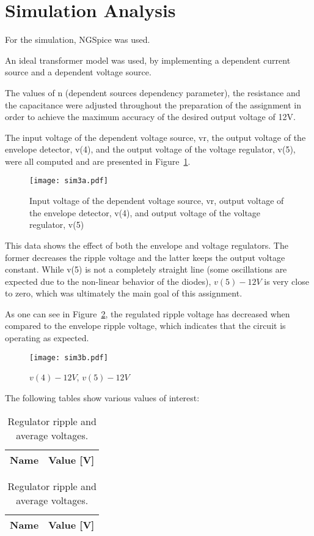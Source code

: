 \section{Simulation Analysis}
\label{sec:simulation}

For the simulation, NGSpice was used.

An ideal transformer model was used, by implementing a dependent current source and a dependent voltage source. 

The values of n (dependent sources dependency parameter), the resistance and the capacitance were adjusted throughout the preparation of the assignment in order to achieve the maximum accuracy of the desired output voltage of 12V.

The input voltage of the dependent voltage source, vr, the output voltage of the envelope detector, v(4), and the output voltage of the voltage regulator, v(5), were all computed and are presented in Figure~\ref{fig:sim3a}.

\begin{figure}[h] \centering
\texttt{[image: sim3a.pdf]}
	\caption{Input voltage of the dependent voltage source, vr, output voltage of the envelope detector, v(4), and output voltage of the voltage regulator, v(5)}
\label{fig:sim3a}
\end{figure}


This data shows the effect of both the envelope and voltage regulators. The former decreases the ripple voltage and the latter keeps the output voltage constant. While v(5) is not a completely straight line (some oscillations are expected due to the non-linear behavior of the diodes), $v(5) - 12V$ is very close to zero, which was ultimately the main goal of this assignment. 

As one can see in Figure~\ref{fig:sim3b}, the regulated ripple voltage has decreased when compared to the envelope ripple voltage, which indicates that the circuit is operating as expected. 

\begin{figure}[h] \centering
\texttt{[image: sim3b.pdf]}
	\caption{$v(4)-12V$, $v(5)-12V$}                        
\label{fig:sim3b} 
\end{figure}

The following tables show various values of interest:

\begin{table}[h]
        \parbox{.45\linewidth}{
  \centering
  \begin{tabular}{|l|r|}
    \hline
    {\bf Name} & {\bf Value [V]} \\ \hline
    
  \end{tabular}
  \caption{Envelope ripple and average voltages.}
	\label{tab:env}
}
\hfill
        \parbox{.45\linewidth}{
  \centering
  \begin{tabular}{|l|r|}
    \hline
    {\bf Name} & {\bf Value [V]} \\ \hline
    
  \end{tabular}
  \caption{Regulator ripple and average voltages.}
  \label{tab:reg}
}
\end{table}




